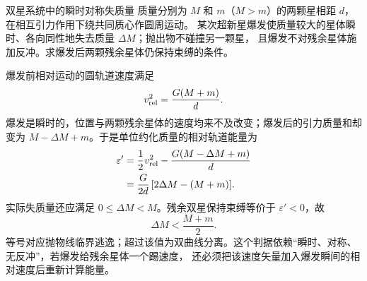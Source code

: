 \begin{origexamplebox}{双星系统中的瞬时对称失质量}
\label{ch11:ex:04}
质量分别为 $M$ 和 $m$（$M>m$）的两颗星相距 $d$，在相互引力作用下绕共同质心作圆周运动。
某次超新星爆发使质量较大的星体瞬时、各向同性地失去质量 $\Delta M$；抛出物不碰撞另一颗星，
且爆发不对残余星体施加反冲。求爆发后两颗残余星体仍保持束缚的条件。

\ThQMassLoss
\end{origexamplebox}
\begin{xesolution}
\ThAMassLoss

爆发前相对运动的圆轨道速度满足
\[
 v_{\rm rel}^2=\frac{G(M+m)}{d}.
\]
爆发是瞬时的，位置与两颗残余星体的速度均来不及改变；爆发后的引力质量和却变为
$M-\Delta M+m$。于是单位约化质量的相对轨道能量为
\begin{align*}
 \varepsilon'
 &=\frac12v_{\rm rel}^2-\frac{G(M-\Delta M+m)}{d}\\
 &=\frac{G}{2d}\,[2\Delta M-(M+m)].
\end{align*}
实际失质量还应满足 $0\le\Delta M<M$。残余双星保持束缚等价于 $\varepsilon'<0$，故
\[
 \boxed{\Delta M<\frac{M+m}{2}}.
\]
等号对应抛物线临界逃逸；超过该值为双曲线分离。这个判据依赖“瞬时、对称、无反冲”，若爆发给残余星体一个踢速度，
还必须把该速度矢量加入爆发瞬间的相对速度后重新计算能量。
\end{xesolution}

